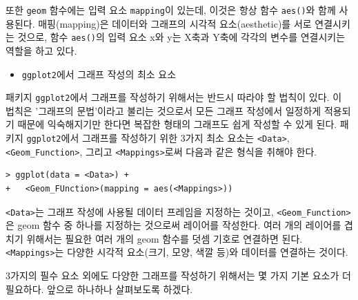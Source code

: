 \documentclass[
]{book}
\providecommand{\tightlist}{%
  \setlength{\itemsep}{0pt}\setlength{\parskip}{0pt}}
\begin{document}
또한 \texttt{geom} 함수에는 입력 요소 \texttt{mapping}이 있는데, 이것은 항상 함수 \texttt{aes()}와 함께 사용된다.
매핑(mapping)은 데이터와 그래프의 시각적 요소(aesthetic)를 서로 연결시키는 것으로,
함수 \texttt{aes()}의 입력 요소 x와 y는 X축과 Y축에 각각의 변수를 연결시키는 역할을 하고 있다.

\begin{itemize}
\tightlist
\item
  \texttt{ggplot2}에서 그래프 작성의 최소 요소
\end{itemize}

패키지 \texttt{ggplot2}에서 그래프를 작성하기 위해서는 반드시 따라야 할 법칙이 있다.
이 법칙은 '그래프의 문법'이라고 불리는 것으로서 모든 그래프 작성에서 일정하게 적용되기 때문에
익숙해지기만 한다면 복잡한 형태의 그래프도 쉽게 작성할 수 있게 된다.
패키지 \texttt{ggplot2}에서 그래프를 작성하기 위한 3가지 최소 요소는 \texttt{\textless{}Data\textgreater{}}, \texttt{\textless{}Geom\_Function\textgreater{}},
그리고 \texttt{\textless{}Mappings\textgreater{}}로써 다음과 같은 형식을 취해야 한다.

\begin{verbatim}
> ggplot(data = <Data>) +
+   <Geom_FUnction>(mapping = aes(<Mappings>))
\end{verbatim}

\texttt{\textless{}Data\textgreater{}}는 그래프 작성에 사용될 데이터 프레임을 지정하는 것이고,
\texttt{\textless{}Geom\_Function\textgreater{}}은 geom 함수 중 하나를 지정하는 것으로써 레이어를 작성한다.
여러 개의 레이어를 겹치기 위해서는 필요한 여러 개의 geom 함수를 덧셈 기호로 연결하면 된다.
\texttt{\textless{}Mappings\textgreater{}}는 다양한 시각적 요소(크기, 모양, 색깔 등)와 데이터를 연결하는 것이다.

3가지의 필수 요소 외에도 다양한 그래프를 작성하기 위해서는 몇 가지 기본 요소가 더
필요하다. 앞으로 하나하나 살펴보도록 하겠다.

  
\end{document}
